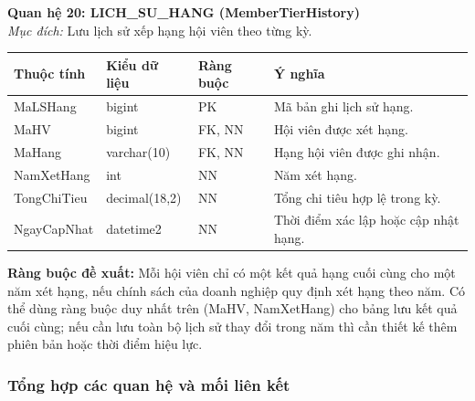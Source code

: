\documentclass[11pt, a4paper]{article}
\begin{document}
\vspace{0.8em}
\textbf{Quan hệ 20: LICH\_SU\_HANG (MemberTierHistory)} \\
\textit{Mục đích:} Lưu lịch sử xếp hạng hội viên theo từng kỳ.

\begin{small}
\begin{tabularx}{\textwidth}{| C{2.8cm} | C{2.4cm} | C{2.2cm} | Y |}
\hline
\textbf{Thuộc tính} & \textbf{Kiểu dữ liệu} & \textbf{Ràng buộc} & \textbf{Ý nghĩa} \\
\hline
MaLSHang & bigint & PK & Mã bản ghi lịch sử hạng. \\
\hline
MaHV & bigint & FK, NN & Hội viên được xét hạng. \\
\hline
MaHang & varchar(10) & FK, NN & Hạng hội viên được ghi nhận. \\
\hline
NamXetHang & int & NN & Năm xét hạng. \\
\hline
TongChiTieu & decimal(18,2) & NN & Tổng chi tiêu hợp lệ trong kỳ. \\
\hline
NgayCapNhat & datetime2 & NN & Thời điểm xác lập hoặc cập nhật hạng. \\
\hline
\end{tabularx}
\end{small}

\textbf{Ràng buộc đề xuất:} Mỗi hội viên chỉ có một kết quả hạng cuối cùng cho một năm xét hạng, nếu chính sách của doanh nghiệp quy định xét hạng theo năm. Có thể dùng ràng buộc duy nhất trên (MaHV, NamXetHang) cho bảng lưu kết quả cuối cùng; nếu cần lưu toàn bộ lịch sử thay đổi trong năm thì cần thiết kế thêm phiên bản hoặc thời điểm hiệu lực.

\subsubsection{Tổng hợp các quan hệ và mối liên kết}
\end{document}
